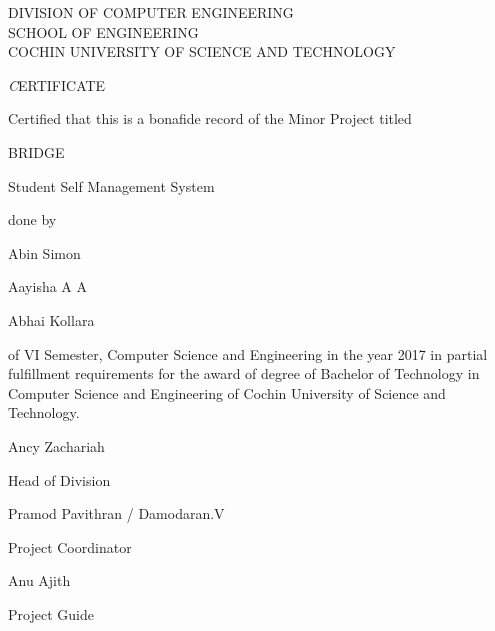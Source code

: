 \documentclass{article}
\begin{document}
\begin{center}

\LARGE
DIVISION OF COMPUTER ENGINEERING\\
SCHOOL OF ENGINEERING\\
COCHIN UNIVERSITY OF SCIENCE AND TECHNOLOGY\\

\hspace{1em}

\huge
{\emph CERTIFICATE}

\hspace{1em}

\large
Certified that this is a bonafide record of the Minor Project titled

\hspace{1em}

\LARGE
BRIDGE

\large
Student Self Management System

\hspace{1em}

done by

\hspace{1em}

\Large
Abin Simon

\Large
Aayisha A A

\Large
Abhai Kollara

\hspace{1em}

\large
of VI Semester, Computer Science and Engineering in the year 2017 in partial fulfillment requirements for the award of degree of Bachelor of Technology in Computer Science and Engineering of Cochin University of Science and Technology.

\hspace{1em}
\vspace{5em}

\begin{minipage}[b]{0.33333\textwidth}
\raggedright
Ancy Zachariah

Head of Division\\
\end{minipage}%
\begin{minipage}[b]{0.33333\textwidth}
\centering
Pramod Pavithran / Damodaran.V

Project Coordinator\\
\end{minipage}%
\begin{minipage}[b]{0.33333\textwidth}
\raggedleft
Anu Ajith

Project Guide\\
\end{minipage}



\end{center}
\end{document}

